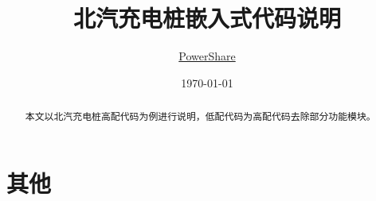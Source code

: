 \documentclass[lang=cn]{elegantpaper}
\title{北汽充电桩嵌入式代码说明}
\author{\href{http://www.powershare.com.cn/}{PowerShare}}
\date{\today}
\begin{document}
\maketitle

\begin{abstract}
\noindent 本文以北汽充电桩高配代码为例进行说明，低配代码为高配代码去除部分功能模块。
\end{abstract}


\section{其他}
\end{document}
